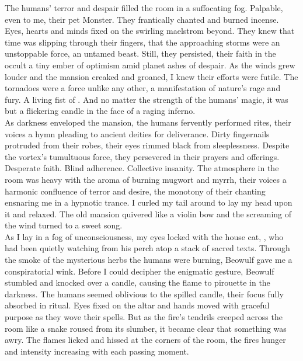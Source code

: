 
The humans' terror and despair filled the room in a suffocating fog. Palpable, even to me, their pet  Monster. They frantically chanted and burned incense. Eyes, hearts and minds fixed on the swirling maelstrom beyond. They knew that time was slipping through their fingers, that the approaching storms were an unstoppable force, an untamed beast. Still, they persisted, their faith in the occult a tiny ember of optimism amid planet  ashes of despair. As the winds grew louder and the mansion creaked and groaned, I knew their efforts were futile. The tornadoes were a force unlike any other, a manifestation of nature's rage and fury. A living fist of . And no matter the strength of the humans' magic, it was but a flickering candle in the face of a raging inferno. \\

As darkness enveloped the mansion, the humans fervently performed rites, their voices a hymn pleading to ancient deities for deliverance. Dirty fingernails protruded from their robes, their eyes rimmed black from sleeplessness. Despite the vortex's tumultuous force, they persevered in their prayers and offerings. Desperate faith. Blind adherence. Collective insanity. The atmosphere in the room was heavy with the aroma of burning mugwort and myrrh, their voices a harmonic confluence of terror and desire, the monotony of their chanting ensnaring me in a hypnotic trance. I curled my tail around to lay my head upon it and relaxed. The old mansion quivered like a violin bow and the screaming of the wind turned to a sweet song. \\

As I lay in a fog of unconsciousness, my eyes locked with the house cat, , who had been quietly watching from his perch atop a stack of sacred texts. Through the smoke of the mysterious herbs the humans were burning, Beowulf gave me a conspiratorial wink. Before I could decipher the enigmatic gesture, Beowulf stumbled and knocked over a candle, causing the flame to pirouette in the darkness. The humans seemed oblivious to the spilled candle, their focus fully absorbed in ritual. Eyes fixed on the altar and hands moved with graceful purpose as they wove their spells. But as the fire's tendrils creeped across the room like a snake roused from its slumber, it became clear that something was awry. The flames licked and hissed at the corners of the room, the fires hunger and intensity increasing with each passing moment. \\

